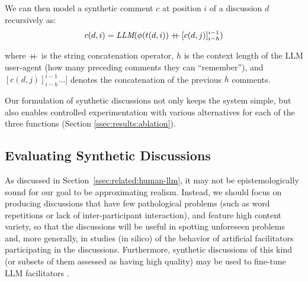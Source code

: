 We can then model a synthetic comment $c$ at position $i$ of a discussion $d$ recursively as:
\begin{equation}
\label{eq:comment}
    c(d, i) = \textit{LLM}(\phi(t(d, i)) \mathbin{{+}\mspace{-8mu}{+}} [c(d, j)]^{i-1}_{i-h})
\end{equation}

\noindent where $\mathbin{{+}\mspace{-8mu}{+}}$ is the string concatenation operator, $h$ is the context length of the \ac{LLM} user-agent (how many preceding comments they can “remember”), and $[c(d,j)]_{i-h}^{i-1}\dots]$ denotes the concatenation of the previous $h$ comments.

Our formulation of synthetic discussions not only keeps the system simple, but also enables controlled experimentation with various alternatives for each of the three functions (Section \ref{ssec:results:ablation}).






\subsection{Evaluating Synthetic Discussions}
\label{ssec:methodology:diversity}

As discussed in Section~\ref{ssec:related:human-llm}, it may not be epistemologically sound for our goal to be approximating realism. Instead, we should focus on producing discussions that have few pathological problems (such as word repetitions or lack of inter-participant interaction), and feature high content variety, so that the discussions will be useful in spotting unforeseen problems and, more generally, in studies (in silico) of the behavior of artificial facilitators participating in the discussions. Furthermore, synthetic discussions of this kind (or subsets of them assessed as having high quality) may be used to fine-tune \ac{LLM} facilitators \cite{ulmer2024}. 

